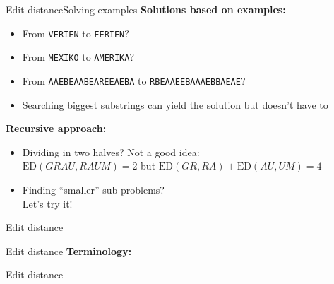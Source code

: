 \begin{frame}{Edit distance}{Solving examples}
  \textbf{Solutions based on examples:}
  \begin{itemize}
    \item
      From \texttt{VERIEN} to \texttt{FERIEN}?
    \item
      From \texttt{MEXIKO} to \texttt{AMERIKA}?
    \item
      From \texttt{AAEBEAABEAREEAEBA} to \texttt{RBEAAEEBAAAEBBAEAE}?
    \item
      Searching biggest substrings can yield the solution but doesn't have to
  \end{itemize}
  \vspace{1.0em}
  \textbf{Recursive approach:}
  \begin{itemize}
    \item
      Dividing in two halves? Not a good idea:\\[0.5em]
      {\color{Mittel-Blau}$\mathrm{ED}(GRAU, RAUM) = 2$} \; but \;
      {\color{Mittel-Blau}$\mathrm{ED}(GR, RA) + \mathrm{ED}(AU, UM) = 4$}
      \\[0.5em]
    \item
      Finding \enquote{smaller} sub problems?\\
      {\color{gray}Let's try it!}
  \end{itemize}
\end{frame}


\begin{frame}{Edit distance}
\end{frame}


\begin{frame}{Edit distance}
  \textbf{Terminology:}
\end{frame}


\begin{frame}{Edit distance}
  
\end{frame}

%      
